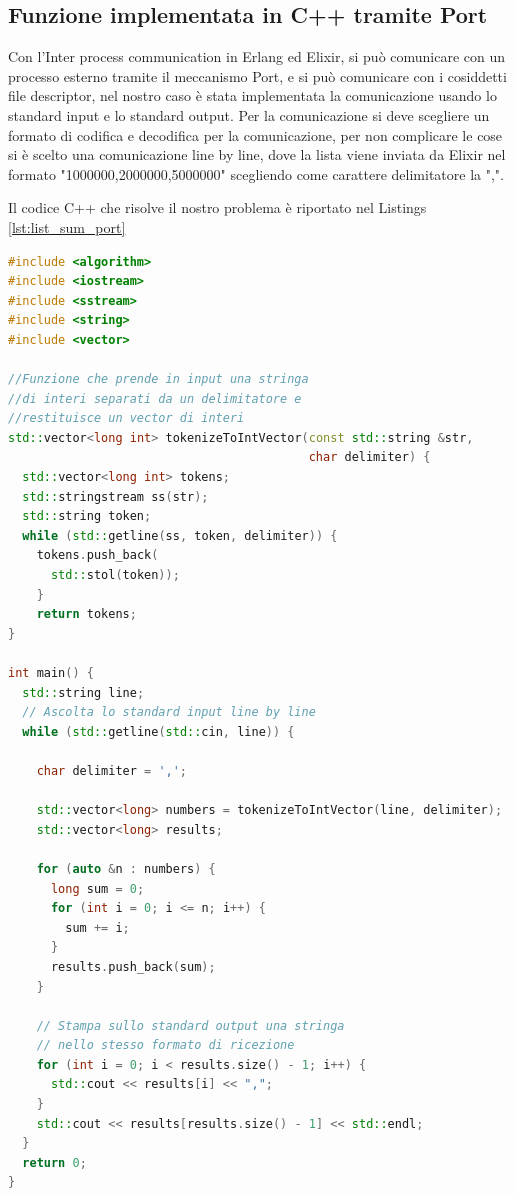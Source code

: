 
\subsection{Funzione implementata in C++ tramite Port}

Con l'Inter process communication in Erlang ed Elixir, si può comunicare
con un processo esterno tramite il meccanismo Port, e si può comunicare con
i cosiddetti file descriptor, nel nostro caso è stata implementata la
comunicazione usando lo standard input e lo standard output. 
Per la comunicazione si deve scegliere un formato di codifica e decodifica
per la comunicazione, per non complicare le cose si è scelto
una comunicazione line by line, dove la lista viene inviata
da Elixir nel formato "1000000,2000000,5000000" scegliendo come
carattere delimitatore la ",".

Il codice C++ che risolve il nostro problema è riportato nel Listings
\ref{lst:list_sum_port}

\begin{lstlisting}[language=cpp,captionpos=b,
	caption={Funzione list\_sum\_port()},
	label={lst:list_sum_port}]
#include <algorithm>
#include <iostream>
#include <sstream>
#include <string>
#include <vector>
	
//Funzione che prende in input una stringa
//di interi separati da un delimitatore e
//restituisce un vector di interi
std::vector<long int> tokenizeToIntVector(const std::string &str,
                                          char delimiter) {
  std::vector<long int> tokens;
  std::stringstream ss(str);
  std::string token;
  while (std::getline(ss, token, delimiter)) {
    tokens.push_back(
      std::stol(token));
	}
	return tokens;
}
	
int main() {
  std::string line;
  // Ascolta lo standard input line by line
  while (std::getline(std::cin, line)) {

    char delimiter = ',';

    std::vector<long> numbers = tokenizeToIntVector(line, delimiter);
    std::vector<long> results;

    for (auto &n : numbers) {
      long sum = 0;
      for (int i = 0; i <= n; i++) {
        sum += i;
      }
      results.push_back(sum);
    }

    // Stampa sullo standard output una stringa
    // nello stesso formato di ricezione
    for (int i = 0; i < results.size() - 1; i++) {
      std::cout << results[i] << ",";
    }
    std::cout << results[results.size() - 1] << std::endl;
  }
  return 0;
}

\end{lstlisting}

